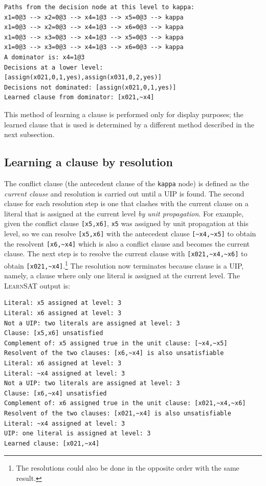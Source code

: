 \documentclass[11pt]{report}
\newcommand*{\p}[1]{\textup{\texttt{#1}}}
\newcommand*{\ls}{\textsc{LearnSAT}}
\begin{document}
\begin{verbatim}
Paths from the decision node at this level to kappa:
x1=0@3 --> x2=0@3 --> x4=1@3 --> x5=0@3 --> kappa
x1=0@3 --> x2=0@3 --> x4=1@3 --> x6=0@3 --> kappa
x1=0@3 --> x3=0@3 --> x4=1@3 --> x5=0@3 --> kappa
x1=0@3 --> x3=0@3 --> x4=1@3 --> x6=0@3 --> kappa
A dominator is: x4=1@3
Decisions at a lower level: [assign(x021,0,1,yes),assign(x031,0,2,yes)]
Decisions not dominated: [assign(x021,0,1,yes)]
Learned clause from dominator: [x021,~x4]
\end{verbatim}

This method of learning a clause is performed only for display purposes;
the learned clause that is used is determined by a different method
described in the next subsection.

\subsection{Learning a clause by resolution}

The conflict clause (the antecedent clause of the \p{kappa} node) is
defined as the \emph{current clause} and resolution is carried out until
a UIP is found. The second clause for each resolution step is one that
clashes with the current clause on a literal that is assigned at the
current level \emph{by unit propagation}. For example, given the
conflict clause \p{[x5,x6]}, \p{x5} was assigned by unit propagation at
this level, so we can resolve \p{[x5,x6]} with the antecedent clause 
\verb+[~x4,~x5]+ to obtain the resolvent \verb+[x6,~x4]+
which is also a conflict clause and becomes the current clause.
The next step is to resolve the current clause with
\verb+[x021,~x4,~x6]+ to obtain \verb+[x021,~x4]+.\footnote{The
resolutions could also be done in the opposite order with the same
result.} The resolution now terminates because clause is a UIP, namely,
a clause where only one literal is assigned at the current level. The
\ls{} output is:

\begin{verbatim}
Literal: x5 assigned at level: 3
Literal: x6 assigned at level: 3
Not a UIP: two literals are assigned at level: 3
Clause: [x5,x6] unsatisfied
Complement of: x5 assigned true in the unit clause: [~x4,~x5]
Resolvent of the two clauses: [x6,~x4] is also unsatisfiable
Literal: x6 assigned at level: 3
Literal: ~x4 assigned at level: 3
Not a UIP: two literals are assigned at level: 3
Clause: [x6,~x4] unsatisfied
Complement of: x6 assigned true in the unit clause: [x021,~x4,~x6]
Resolvent of the two clauses: [x021,~x4] is also unsatisfiable
Literal: ~x4 assigned at level: 3
UIP: one literal is assigned at level: 3
Learned clause: [x021,~x4]
\end{verbatim}
\end{document}
